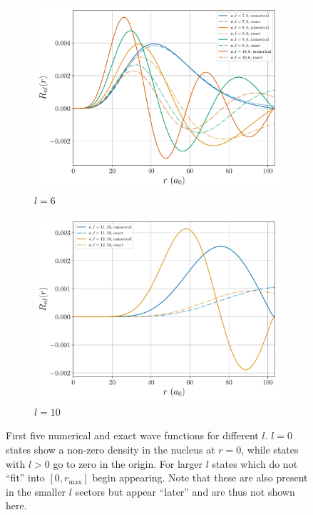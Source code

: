 \documentclass[a4paper,DIV=12,english]{scrartcl}
\begin{document}
\begin{figure}
\begin{subfigure}{0.49\textwidth}
        \includegraphics[width=\textwidth]{../plots/psis_comp/l6.pdf}
        \caption{$l=6$}
        \label{subfig:6}
    \end{subfigure}
    \begin{subfigure}{0.49\textwidth}
        \centering
        \includegraphics[width=\textwidth]{../plots/psis_comp/l10.pdf}
        \caption{$l=10$}
        \label{subfig:l10}
    \end{subfigure}
    \caption{First five numerical and exact wave functions for different $l$. $l=0$ states show a non-zero density in the nucleus at $r=0$, while states with $l>0$ go to zero in the origin. For larger $l$ states which do not \enquote{fit} into $[0, r_\text{max}]$ begin appearing. Note that these are also present in the smaller $l$ sectors but appear \enquote{later} and are thus not shown here.}
    \label{fig:psi}
\end{figure}
\end{document}
